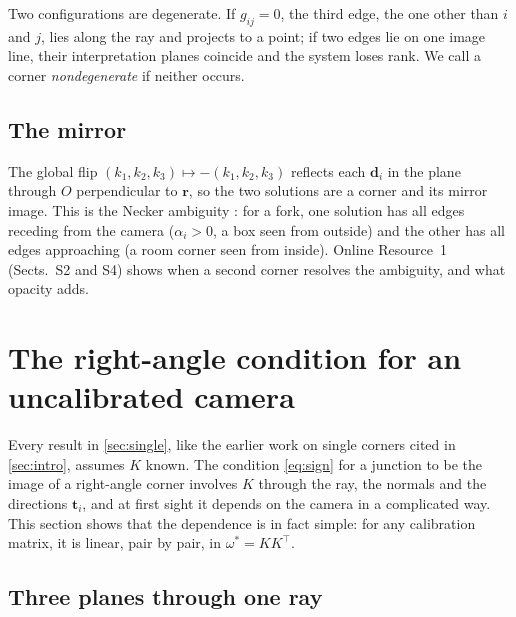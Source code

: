 \documentclass[pdflatex,sn-mathphys-num,iicol]{sn-jnl}
\newcommand{\vd}{\mathbf{d}}
\newcommand{\vr}{\mathbf{r}}
\newcommand{\vt}{\mathbf{t}}
\newcommand{\OR}{Online Resource~1}
\theoremstyle{thmstyleone}
\theoremstyle{thmstylethree}
\theoremstyle{thmstyletwo}
\begin{document}
Two configurations are degenerate. If $g_{ij}=0$, the third edge, the one other than $i$ and $j$, lies along the ray and projects to a point; if two edges lie on one image line, their interpretation planes coincide and the system loses rank. We call a corner \emph{nondegenerate} if neither occurs.

\subsection{The mirror}\label{sec:mirror1}

The global flip $(k_1,k_2,k_3)\mapsto-(k_1,k_2,k_3)$ reflects each $\vd_i$ in the plane through $O$ perpendicular to $\vr$, so the two solutions are a corner and its mirror image. This is the Necker ambiguity \citep[Theorem~4]{kanatani1988}: for a fork, one solution has all edges receding from the camera ($\alpha_i>0$, a box seen from outside) and the other has all edges approaching (a room corner seen from inside). \OR{} (Sects.~S2 and S4) shows when a second corner resolves the ambiguity, and what opacity adds.

\section{The right-angle condition for an uncalibrated camera}\label{sec:condition}

Every result in \cref{sec:single}, like the earlier work on single corners cited in \cref{sec:intro}, assumes $K$ known. The condition \eqref{eq:sign} for a junction to be the image of a right-angle corner involves $K$ through the ray, the normals and the directions $\vt_i$, and at first sight it depends on the camera in a complicated way. This section shows that the dependence is in fact simple: for any calibration matrix, it is linear, pair by pair, in $\omega^{*}=KK^{\top}$.

\subsection{Three planes through one ray}\label{sec:identity}
\end{document}
